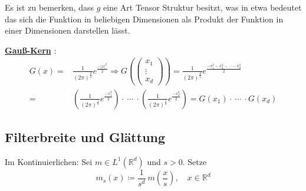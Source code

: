\documentclass{article}
\theoremstyle{plain}
\theoremstyle{definition}
\numberwithin{equation}{section}
\newcommand{\abs}[1] {
\left| #1 \right|
}
\newcommand{\R}[0] {
\mathbb R
}
\newcommand{\srmatrix}[1] {
\left( \begin{smallmatrix} #1 \end{smallmatrix} \right)
}
\newcommand{\mim}[1] {
\underline{\textbf{#1\index{#1}}}
}
\newcommand{\quo}[1] {
\glqq #1 \grqq
}
\newcommand{\x}[0] {
  \boldsymbol{x}
}
\begin{document}
    Es ist zu bemerken, dass $g$ eine Art Tensor Struktur besitzt, was in etwa bedeutet das sich die Funktion in beliebigen Dimensionen als Produkt der Funktion in einer Dimensionen darstellen lässt.

    \mim{Gauß-Kern}:
    \begin{align*}
        G(x) =& \frac{1}{(2 \pi)^{\frac{d}{2}}} e^{\frac{-\abs{x}^2}{2}} \Rightarrow G\left( \srmatrix{x_1\\\vdots\\x_d} \right) = \frac{1}{(2 \pi)^{\frac{d}{2}}} e^{\frac{-x_1^2-x_2^2 - \cdots - x_d^2}{2}}\\
        =& \left( \frac{1}{(2 \pi)^\frac{1}{2}} e^{\frac{-x_1^2}{2}}\right) \cdot \ \cdots \ \cdot \left( \frac{1}{(2 \pi)^\frac{1}{2}} e^{\frac{-x_d^2}{2}}\right) = G(x_1) \cdot \ \cdots \ \cdot G(x_d)
    \end{align*}

    \subsection{Filterbreite und Glättung}

    \begin{center}
    \end{center}

    Im Kontinuierlichen: Sei $m \in L^1(\R^d)$ und $s > 0$.
    Setze
        \[m_s(x)  \coloneqq  \frac{1}{s^d} \ m \left(\frac{x}{s}\right), \quad x\in \R^d\]
\end{document}
